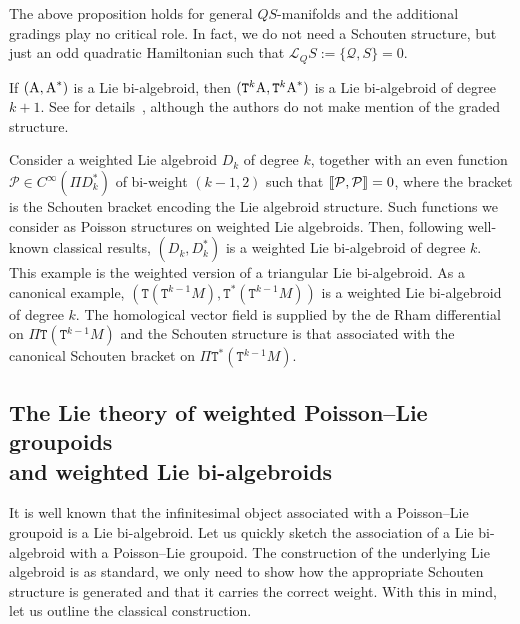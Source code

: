 \documentclass[10pt,a4paper]{amsart}
\newcommand{\Dleft}{[\hspace{-1.5pt}[}
\newcommand{\Dright}{]\hspace{-1.5pt}]}
\newcommand{\SN}[1]{\Dleft #1 \Dright}
\def\sT{{\mathtt T}}
\numberwithin{equation}{section}
\begin{document}
\begin{Remark} The above proposition holds for general $QS$-manifolds and the additional gradings play no critical role. In fact, we do not need a Schouten structure, but just an odd quadratic Hamiltonian such that $\mathcal{L}_{Q}S:= \{\mathcal{Q}, S \} =0$.
\end{Remark}


\begin{Example}
If $(\textnormal{A}, \textnormal{A}^{*})$ is a Lie bi-algebroid, then $(\sT^{k}\textnormal{A}, \sT^{k}\textnormal{A}^{*})$ is a Lie bi-algebroid of degree $k+1$. See for details~\cite{KouotchopWamba:2013}, although  the authors do not make mention of the graded structure.
\end{Example}

\begin{Example}
Consider a weighted Lie algebroid $D_{k}$ of degree $k$, together with an even function $\mathcal{P} \in C^{\infty}(\Pi D_{k}^{*})$ of bi-weight $(k-1, 2)$ such that $\SN{\mathcal{P}, \mathcal{P}} =0$, where the bracket is the Schouten bracket encoding the Lie algebroid structure. Such functions we consider as Poisson structures on weighted Lie algebroids. Then, following well-known classical results, $(D_{k}, D_{k}^{*})$ is a weighted Lie bi-algebroid of degree $k$. This example is the weighted version of a triangular Lie bi-algebroid. As a canonical example, $(\sT(\sT^{k-1}M), \sT^{*}(\sT^{k-1}M))$ is a weighted Lie bi-algebroid of degree $k$.  The homological vector f\/ield is supplied by the de Rham dif\/ferential on $\Pi \sT(\sT^{k-1}M)$ and the Schouten structure is that associated with the canonical Schouten bracket on $\Pi \sT^{*}(\sT^{k-1}M)$.
\end{Example}

\subsection[The Lie theory of weighted Poisson--Lie groupoids and weighted Lie bi-algebroids]{The Lie theory of weighted Poisson--Lie groupoids\\ and weighted Lie bi-algebroids}

It is well known that the inf\/initesimal object associated with a Poisson--Lie groupoid is a Lie bi-algebroid. Let us quickly sketch the association of a Lie bi-algebroid with a Poisson--Lie groupoid. The construction of the underlying Lie algebroid is as standard, we only need to show how the appropriate Schouten  structure is generated and that it carries the correct weight. With this in mind, let us outline the classical construction.
\end{document}
